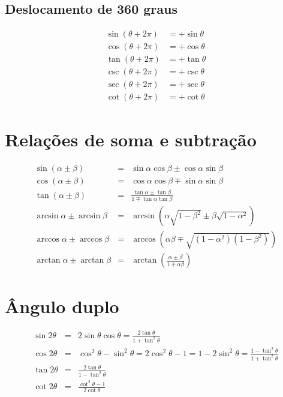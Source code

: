 \documentclass[
	article,			%
	12pt,				%
	twoside,			%
	a4paper,			%
	english,			%
	brazil,				%
	sumario=tradicional
	]{abntex2-modelo-notas-de-aula}
\begin{document}
\begin{apendicesenv}
\subsection{Deslocamento de 360 graus}
\begin{eqnarray}
\sin(\theta + 2\pi) &= +\sin \theta \\
\cos(\theta + 2\pi) &= +\cos \theta \\
\tan(\theta + 2\pi) &= +\tan \theta \\
\csc(\theta + 2\pi) &= +\csc \theta \\
\sec(\theta + 2\pi) &= +\sec \theta \\
\cot(\theta + 2\pi) &= +\cot \theta
\end{eqnarray}




\section{Relações de soma e subtração}

\begin{eqnarray}
\sin(\alpha \pm \beta) & =& \sin \alpha \cos \beta \pm \cos \alpha \sin \beta \\
\cos(\alpha \pm \beta) & =& \cos \alpha \cos \beta \mp \sin \alpha \sin \beta \\
\tan(\alpha \pm \beta) &= &\frac{\tan \alpha \pm \tan \beta}{1 \mp \tan \alpha \tan \beta}\\
\arcsin\alpha \pm \arcsin\beta &=& \arcsin\left(\alpha\sqrt{1-\beta^2} \pm \beta\sqrt{1-\alpha^2}\right)\\
\arccos\alpha \pm \arccos\beta &=& \arccos\left(\alpha\beta \mp \sqrt{(1-\alpha^2)(1-\beta^2)}\right)\\
\arctan\alpha \pm \arctan\beta &=&\arctan\left(\frac{\alpha \pm \beta}{1 \mp \alpha\beta}\right)
\end{eqnarray}



\section{Ângulo duplo}


\begin{eqnarray}
\sin 2\theta &=& 2 \sin \theta \cos \theta  = \frac{2 \tan \theta} {1 + \tan^2 \theta} \\
\cos 2\theta &=& \cos^2 \theta - \sin^2 \theta = 2 \cos^2 \theta - 1 = 1 - 2 \sin^2 \theta = \frac{1 - \tan^2 \theta} {1 + \tan^2 \theta}\\
\tan 2\theta &=& \frac{2 \tan \theta} {1 - \tan^2 \theta}\\
\cot 2\theta &=& \frac{\cot^2 \theta - 1}{2 \cot \theta}
\end{eqnarray}



\end{apendicesenv}
\end{document}
